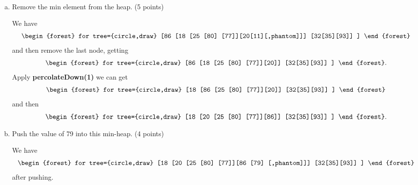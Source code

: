 \documentclass[11pt]{exam}
\begin{document}
\begin{enumerate}[a)]
    \item Remove the min element from the heap. (5 points)
          \begin{solution}
              We have \[ \begin{forest}
                      for tree={circle,draw}
                      [86
                          [18
                                  [25
                                          [80]
                                          [77]][20[11][,phantom]]]
                          [32[35][93]]
                      ]
                  \end{forest} \]
              and then remove the last node, getting \[
                  \begin{forest}
                      for tree={circle,draw}
                      [86
                          [18
                                  [25
                                          [80]
                                          [77]][20]]
                          [32[35][93]]
                      ]
                  \end{forest}. \]
              Apply \textbf{percolateDown(1)} we can get \[
                  \begin{forest}
                      for tree={circle,draw}
                      [18
                          [86
                                  [25
                                          [80]
                                          [77]][20]]
                          [32[35][93]]
                      ]
                  \end{forest} \] and then \[
                  \begin{forest}
                      for tree={circle,draw}
                      [18
                          [20
                                  [25
                                          [80]
                                          [77]][86]]
                          [32[35][93]]
                      ]
                  \end{forest}. \]
          \end{solution}

    \item Push the value of 79 into this min-heap. (4 points)
          \begin{solution}
              We have \[ \begin{forest}
                      for tree={circle,draw}
                      [18
                          [20
                                  [25
                                          [80]
                                          [77]][86 [79] [,phantom]]]
                          [32[35][93]]
                      ]
                  \end{forest}  \]after pushing.


\end{solution}
\end{enumerate}
\end{document}
